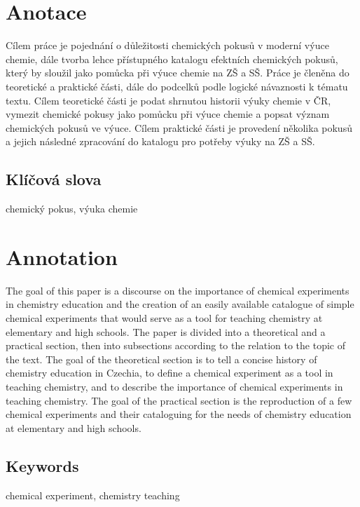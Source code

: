 \documentclass{template/socthesis}
\author{Jan Romanovský}
\begin{document}
	\maketitle


	\pagestyle{empty}

	\section*{Anotace}
	Cílem práce je pojednání o důležitosti chemických pokusů v moderní výuce chemie, dále tvorba lehce přístupného katalogu efektních chemických pokusů, který by sloužil jako pomůcka při výuce chemie na ZŠ a SŠ. Práce je členěna do teoretické a praktické části, dále do podcelků podle logické návaznosti k tématu textu.
	Cílem teoretické části je podat shrnutou historii výuky chemie v ČR, vymezit chemické pokusy jako pomůcku při výuce chemie a popsat význam chemických pokusů ve výuce.
	Cílem praktické části je provedení několika pokusů a jejich následné zpracování do katalogu pro potřeby výuky na ZŠ a SŠ.

	\subsection*{Klíčová slova}
	chemický pokus, výuka chemie

	\vspace{20mm}

	\section*{Annotation}
	The goal of this paper is a discourse on the importance of chemical experiments in chemistry education and the creation of an easily available catalogue of simple chemical experiments that would serve as a tool for teaching chemistry at elementary and high schools. The paper is divided into a theoretical and a practical section, then into subsections according to the relation to the topic of the text.
	The goal of the theoretical section is to tell a concise history of chemistry education in Czechia, to define a chemical experiment as a tool in teaching chemistry, and to describe the importance of chemical experiments in teaching chemistry.
	The goal of the practical section is the reproduction of a few chemical experiments and their cataloguing for the needs of chemistry education at elementary and high schools.

	\subsection*{Keywords}
	chemical experiment, chemistry teaching
\end{document}
